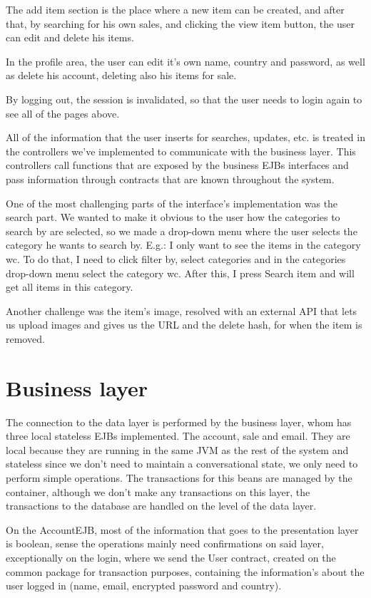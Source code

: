 \documentclass{article}
\begin{document}
\qquad The add item section is the place where a new item can be created, and after that, by searching for his own sales, and clicking the view item button, the user can edit and delete his items.

\qquad In the profile area, the user can edit it's own name, country and password, as well as delete his account, deleting also his items for sale.

\qquad By logging out, the session is invalidated, so that the user needs to login again to see all of the pages above. 

\qquad All of the information that the user inserts for searches, updates, etc. is treated in the controllers we've implemented to communicate with the business layer. This controllers call functions that are exposed by the business \ac{EJB}s interfaces and pass information through contracts that are known throughout the system.

\qquad One of the most challenging parts of the interface's implementation was the search part. We wanted to make it obvious to the user how the categories to search by are selected, so we made a drop-down menu where the user selects the category he wants to search by. E.g.: I only want to see the items in the category wc. To do that, I need to click filter by, select categories and in the categories drop-down menu select the category wc. After this, I press Search item and will get all items in this category.

\qquad Another challenge was the item's image, resolved with an external API that lets us upload images and gives us the URL and the delete hash, for when the item is removed.



\section{Business layer}

\qquad The connection to the data layer is performed by the business layer, whom has three local stateless \ac{EJB}s implemented. The account, sale and email. They are local because they are running in the same \ac{JVM} as the rest of the system and stateless since we don't need to maintain a conversational state, we only need to perform simple operations. The transactions for this beans are managed by the container, although we don't make any transactions on this layer, the transactions to the database are handled on the level of the data layer.

\qquad On the AccountEJB, most of the information that goes to the presentation layer is boolean, sense the operations mainly need confirmations on said layer, exceptionally on the login, where we send the User contract, created on the common package for transaction purposes, containing the information's about the user logged in (name, email, encrypted password and country).
\end{document}
